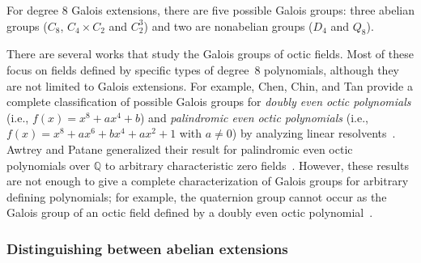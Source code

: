 \documentclass[letterpaper, 10pt]{article}
\newcommand{\1}{\mathds{1}}	%
\theoremstyle{definition}
\theoremstyle{remark}
\begin{document}
For degree 8 Galois extensions, there are five possible Galois groups: three  abelian groups ($C_8$, $C_4 \times C_2$ and $C_2^3$) and two are nonabelian groups ($D_4$ and $Q_8$).

There are several works that study the Galois groups of octic fields. Most of these focus on fields defined by specific types of degree~8 polynomials, although they are not limited to Galois extensions. For example, Chen, Chin, and Tan provide a complete classification of possible Galois groups for \emph{doubly even octic polynomials} (i.e., \( f(x) = x^8 + ax^4 + b \)) and \emph{palindromic even octic polynomials} (i.e., \( f(x) = x^8 + ax^6 + bx^4 + ax^2 + 1 \) with \( a \ne 0 \)) by analyzing linear resolvents~\cite{chen2023galois}. Awtrey and Patane generalized their result for palindromic even octic polynomials over \( \mathbb{Q} \) to arbitrary characteristic zero fields~\cite{awtrey2024galois}. However, these results are not enough to give a complete characterization of Galois groups for arbitrary defining polynomials; for example, the quaternion group cannot occur as the Galois group of an octic field defined by a doubly even octic polynomial~\cite[Theorem 3.1]{chen2023galois}.

\subsubsection{Distinguishing between abelian extensions}
\label{subsubsec:octic_ab}
\end{document}
